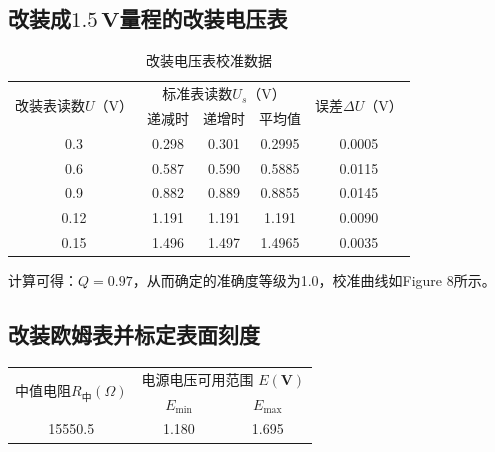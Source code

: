 \documentclass{article}
\begin{document}
\subsection{改装成$1.5\,\mathbf{V}$量程的改装电压表}
\begin{table}[h]
    \centering
    \caption{改装电压表校准数据}
    \renewcommand{\arraystretch}{1.2}
    \vspace{8pt}
    \label{table1}
    \begin{tabular}{ccccc}
        \hline
        \multirow{2}{*}{改装表读数\(U\)（V）} & \multicolumn{3}{c}{标准表读数\(U_s\)（V）} & \multirow{2}{*}{误差\(\Delta U\)（V） }\\
        \cline{2-4} 
         & 递减时 & 递增时 & 平均值 &  \\
         \hline
         0.3   & 0.298 & 0.301 & 0.2995 & 0.0005 \\ \hline
         0.6   & 0.587 & 0.590 & 0.5885 & 0.0115  \\ \hline
         0.9   & 0.882 & 0.889 & 0.8855 & 0.0145  \\ \hline
         0.12  & 1.191 & 1.191 & 1.191  & 0.0090  \\ \hline
         0.15  & 1.496 & 1.497 & 1.4965 & 0.0035 \\ \hline \hline
        \end{tabular}    
\end{table}
计算可得：$Q=0.97$，从而确定的准确度等级为1.0，校准曲线如Figure 8所示。

\subsection{改装欧姆表并标定表面刻度}

\begin{table}[h]
    \centering
    \renewcommand{\arraystretch}{1.2}
    \begin{tabular}{ccc} 
        \hline
        \multirow{2}{*}{中值电阻$R_中(\Omega)$} & \multicolumn{2}{c|}{电源电压可用范围 $E(\mathbf{V})$}\\
        \cline{2-3} 
         & $E_{\min}$ & $E_{\max}$  \\
        \hline
        15550.5 & 1.180 & 1.695\\ \hline
        \hline
        \end{tabular}    
\end{table}
\end{document}
